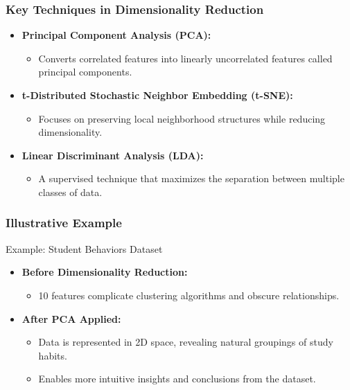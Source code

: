 \documentclass[aspectratio=169]{beamer}
\begin{document}
\begin{frame}[fragile]
    \frametitle{Key Techniques in Dimensionality Reduction}
    \begin{itemize}
        \item \textbf{Principal Component Analysis (PCA):}
        \begin{itemize}
            \item Converts correlated features into linearly uncorrelated features called principal components.
        \end{itemize}

        \item \textbf{t-Distributed Stochastic Neighbor Embedding (t-SNE):}
        \begin{itemize}
            \item Focuses on preserving local neighborhood structures while reducing dimensionality.
        \end{itemize}

        \item \textbf{Linear Discriminant Analysis (LDA):}
        \begin{itemize}
            \item A supervised technique that maximizes the separation between multiple classes of data.
        \end{itemize}
    \end{itemize}
\end{frame}

\begin{frame}[fragile]
    \frametitle{Illustrative Example}
    \begin{block}{Example: Student Behaviors Dataset}
    \begin{itemize}
        \item \textbf{Before Dimensionality Reduction:}
        \begin{itemize}
            \item 10 features complicate clustering algorithms and obscure relationships.
        \end{itemize}
        \item \textbf{After PCA Applied:}
        \begin{itemize}
            \item Data is represented in 2D space, revealing natural groupings of study habits.
            \item Enables more intuitive insights and conclusions from the dataset.
        \end{itemize}
    \end{itemize}
    \end{block}
\end{frame}
\end{document}
